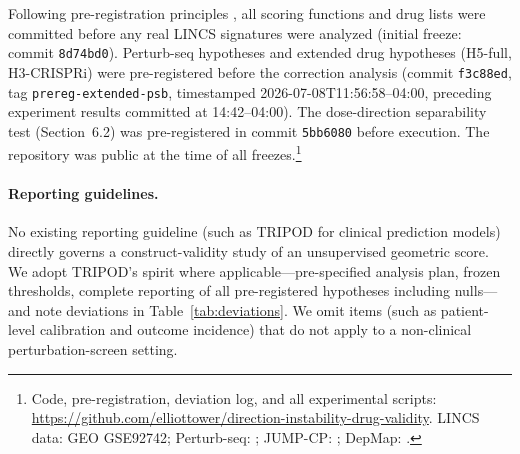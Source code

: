 \documentclass[11pt]{article}
\begin{document}
Following pre-registration principles \citep{nosek2018preregistration},
all scoring functions and drug lists were committed before any real LINCS
signatures were analyzed (initial freeze: commit \texttt{8d74bd0}).
Perturb-seq hypotheses and extended drug hypotheses (H5-full,
H3-CRISPRi) were pre-registered before the correction analysis
(commit \texttt{f3c88ed}, tag \texttt{prereg-extended-psb}, timestamped
2026-07-08T11:56:58--04:00, preceding experiment results committed at
14:42--04:00). The dose-direction separability test
(Section~6.2) was pre-registered in commit \texttt{5bb6080} before
execution. The repository was public at the time of all freezes.\footnote{Code, pre-registration, deviation log, and all
experimental scripts:
\url{https://github.com/elliottower/direction-instability-drug-validity}.
LINCS data: GEO GSE92742; Perturb-seq: \citet{replogle2022mapping};
JUMP-CP: \citet{chandrasekaran2023jump}; DepMap: \citet{dempster2021chronos}.}

\paragraph{Reporting guidelines.}
No existing reporting guideline (such as TRIPOD for clinical prediction models)
directly governs a construct-validity study of an unsupervised geometric score.
We adopt TRIPOD's spirit where applicable---pre-specified analysis plan,
frozen thresholds, complete reporting of all pre-registered hypotheses
including nulls---and note deviations in Table~\ref{tab:deviations}.
We omit items (such as patient-level calibration and outcome incidence) that
do not apply to a non-clinical perturbation-screen setting.
\end{document}
